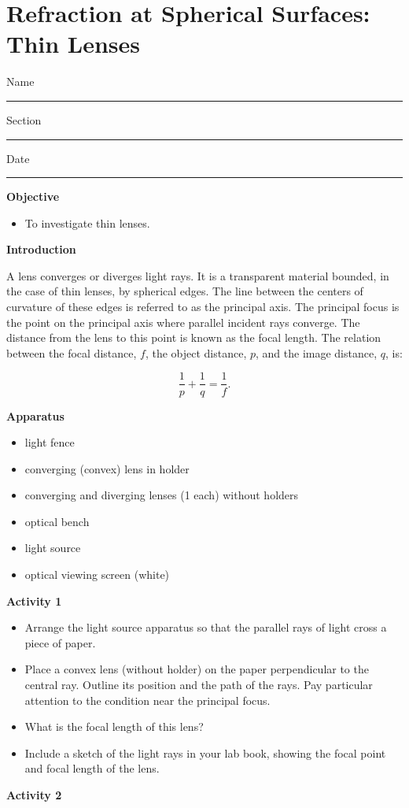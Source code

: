 
\section{Refraction at Spherical Surfaces: Thin Lenses}

Name \rule{2.0in}{0.1pt}\hfill{}Section \rule{1.0in}{0.1pt}\hfill{}Date
\rule{1.0in}{0.1pt}

\textbf{Objective}

\begin{itemize}
\item To investigate thin lenses.
\end{itemize}
\textbf{Introduction} 

A lens converges or diverges light rays. It is a transparent material
bounded, in the case of thin lenses, by spherical edges. The line
between the centers of curvature of these edges is referred to as
the principal axis. The principal focus is the point on the principal
axis where parallel incident rays converge. The distance from the
lens to this point is known as the focal length. The relation between
the focal distance, $f$, the object distance, $p$, and the image distance,
$q$, is:

\begin{displaymath} \frac{1}{p} + \frac{1}{q} = \frac{1}{f}. \end{displaymath}

\textbf{Apparatus}

\begin{itemize}
\item light fence
\item converging (convex) lens in holder
\item converging and diverging lenses (1 each) without holders
\item optical bench 
\item light source 
\item optical viewing screen (white)
\end{itemize}

\textbf{Activity 1}

\begin{itemize}
\item Arrange the light source apparatus so that the parallel rays of light
cross a piece of paper. 
\item Place a convex lens (without holder) on the paper perpendicular to the central ray.
Outline its position and the path of the rays. Pay particular attention
to the condition near the principal focus.
\item What is the focal length of this lens?\vspace{15mm}
\item Include a sketch of the light rays in your lab book, showing the focal point and focal length of the lens.
\end{itemize}
\textbf{Activity 2 }


